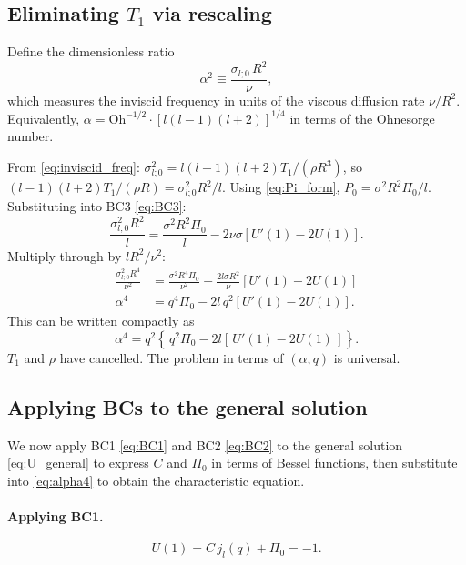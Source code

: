 \documentclass[12pt]{article}
\theoremstyle{definition}
\begin{document}
\subsection{Eliminating $T_1$ via rescaling}

Define the dimensionless ratio
\begin{equation}
  \alpha^2 \equiv \frac{\sigma_{l;0}\,R^2}{\nu},
  \label{eq:alpha_def}
\end{equation}
which measures the inviscid frequency in units of the viscous diffusion rate $\nu/R^2$.
Equivalently, $\alpha = \mathrm{Oh}^{-1/2}\cdot[l(l-1)(l+2)]^{1/4}$ in terms of the
Ohnesorge number.

\begin{derivbox}[Eliminating $T_1$]
From \eqref{eq:inviscid_freq}: $\sigma_{l;0}^2 = l(l-1)(l+2)T_1/(\rho R^3)$,
so $(l-1)(l+2)T_1/(\rho R) = \sigma_{l;0}^2 R^2/l$. Using \eqref{eq:Pi_form},
$P_0 = \sigma^2 R^2\Pi_0/l$. Substituting into BC3 \eqref{eq:BC3}:
\[
  \frac{\sigma_{l;0}^2 R^2}{l}
  = \frac{\sigma^2 R^2\Pi_0}{l} - 2\nu\sigma\!\left[U'(1)-2U(1)\right].
\]
Multiply through by $lR^2/\nu^2$:
\begin{align*}
  \frac{\sigma_{l;0}^2 R^4}{\nu^2}
  &= \frac{\sigma^2 R^4\Pi_0}{\nu^2} - \frac{2l\sigma R^2}{\nu}\!\left[U'(1)-2U(1)\right] \\
  \alpha^4 &= q^4\Pi_0 - 2l\,q^2\!\left[U'(1)-2U(1)\right].
\end{align*}
This can be written compactly as
\begin{equation}
  \alpha^4 = q^2\!\left\{\,q^2\Pi_0 - 2l\!\left[\,U'(1) - 2U(1)\,\right]\right\}.
  \label{eq:alpha4}
\end{equation}
$T_1$ and $\rho$ have cancelled. The problem in terms
of $(\alpha, q)$ is universal.
\end{derivbox}

\subsection{Applying BCs to the general solution}

We now apply BC1 \eqref{eq:BC1} and BC2 \eqref{eq:BC2} to the general solution
\eqref{eq:U_general} to express $C$ and $\Pi_0$ in terms of Bessel functions, then
substitute into \eqref{eq:alpha4} to obtain the characteristic equation.

\paragraph{Applying BC1.}
\begin{equation}
  U(1) = C\,j_l(q) + \Pi_0 = -1.
  \label{eq:bc1_applied}
\end{equation}
\end{document}
